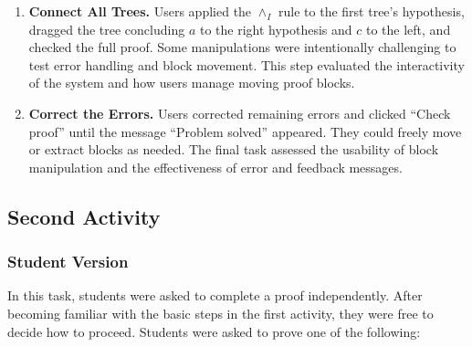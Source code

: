 \begin{enumerate}
    \item \textbf{Connect All Trees.} 
    Users applied the $\land_I$ rule to the first tree’s hypothesis, dragged the tree concluding $a$ to the right hypothesis and $c$ to the left, and checked the full proof. Some manipulations were intentionally challenging to test error handling and block movement. This step evaluated the interactivity of the system and how users manage moving proof blocks.  
    \begin{center}
    \end{center}

    \item \textbf{Correct the Errors.} 
    Users corrected remaining errors and clicked ``Check proof'' until the message ``Problem solved'' appeared. They could freely move or extract blocks as needed.  
    The final task assessed the usability of block manipulation and the effectiveness of error and feedback messages.  
    \begin{center}
    \end{center}
\end{enumerate}

\subsection*{Second Activity}

\subsubsection*{Student Version}
In this task, students were asked to complete a proof independently. After becoming familiar with the basic steps in the first activity, they were free to decide how to proceed. Students were asked to prove one of the following:


